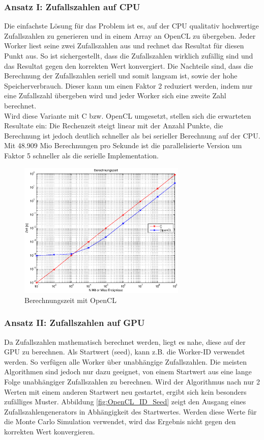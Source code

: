 \documentclass{book}
\begin{document}
\begin{refsection}
\subsubsection{Ansatz I: Zufallszahlen auf CPU}
Die einfachste Lösung für das Problem ist es, auf der CPU qualitativ hochwertige Zufallszahlen zu generieren und in einem Array an OpenCL zu übergeben. Jeder Worker liest seine zwei Zufallszahlen aus und rechnet das Resultat für diesen Punkt aus. So ist sichergestellt, dass die Zufallszahlen wirklich zufällig sind und das Resultat gegen den korrekten Wert konvergiert. Die Nachteile sind, dass die Berechnung der Zufallszahlen seriell und somit langsam ist, sowie der hohe Speicherverbrauch. Dieser kann um einen Faktor 2 reduziert werden, indem nur eine Zufallszahl übergeben wird und jeder Worker sich eine zweite Zahl berechnet. \\

Wird diese Variante mit C bzw. OpenCL umgesetzt, stellen sich die erwarteten Resultate ein: Die Rechenzeit steigt linear mit der Anzahl Punkte, die Berechnung ist jedoch deutlich schneller als bei serieller Berechnung auf der CPU. Mit 48.909 Mio Berechnungen pro Sekunde ist die parallelisierte Version um Faktor 5 schneller  als die serielle Implementation.

\begin{figure}[htbp]
	\centering
	\includegraphics[width=8cm]{images/Berechnungszeit_OpenCL.eps}
	\caption{Berechnungszeit mit OpenCL}
	\label{fig:OpenCL_Berechnungszeit}
\end{figure}


\subsubsection{Ansatz II: Zufallszahlen auf GPU}
Da Zufallszahlen mathematisch berechnet werden, liegt es nahe, diese auf der GPU zu berechnen. Als Startwert (seed), kann z.B. die Worker-ID verwendet werden. So verfügen alle Worker über unabhängige Zufallszahlen. Die meisten Algorithmen sind jedoch nur dazu geeignet, von einem Startwert aus eine lange Folge unabhängiger Zufallszahlen zu berechnen. Wird der Algorithmus nach nur 2 Werten mit einem anderen Startwert neu gestartet, ergibt sich kein besonders zufälliges Muster. Abbildung \ref{fig:OpenCL_ID_Seed} zeigt den Ausgang eines Zufallszahlengenerators in Abhängigkeit des Startwertes. Werden diese Werte für die Monte Carlo Simulation verwendet, wird das Ergebnis nicht gegen den korrekten Wert konvergieren. 


\end{refsection}
\end{document}
